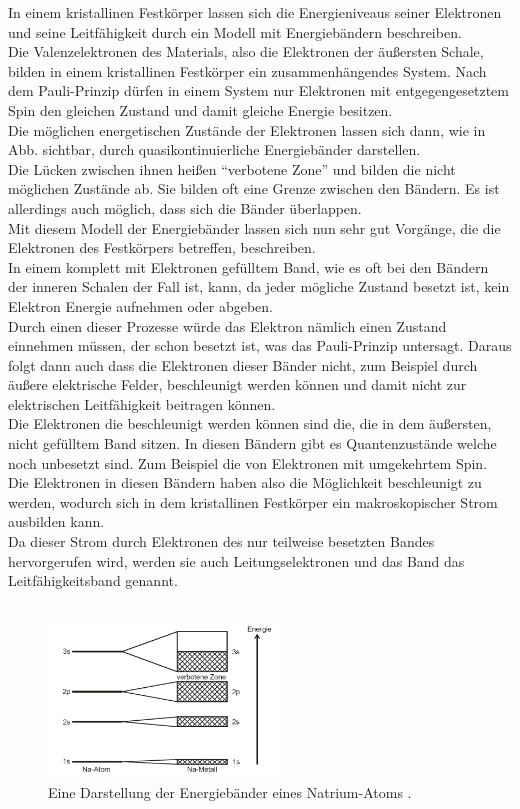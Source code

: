 In einem kristallinen Festkörper lassen sich die Energieniveaus seiner Elektronen und seine Leitfähigkeit durch
ein Modell mit Energiebändern beschreiben.\\
Die Valenzelektronen des Materials, also die Elektronen der äußersten Schale, 
bilden in einem kristallinen Festkörper ein zusammenhängendes System. Nach dem Pauli-Prinzip dürfen in einem System nur Elektronen mit entgegengesetztem Spin
den gleichen Zustand und damit gleiche Energie besitzen.\\
Die möglichen energetischen Zustände der Elektronen lassen sich dann, wie in Abb. sichtbar,
durch quasikontinuierliche Energiebänder darstellen.\\
Die Lücken zwischen ihnen heißen \enquote{verbotene Zone} und bilden die nicht möglichen Zustände ab. 
Sie bilden oft eine Grenze zwischen den Bändern.
Es ist allerdings auch möglich, dass sich die Bänder überlappen.\\
Mit diesem Modell der Energiebänder lassen sich nun sehr gut Vorgänge, die die Elektronen des Festkörpers betreffen, beschreiben.\\
In einem komplett mit Elektronen gefülltem Band, wie es oft bei den Bändern der inneren 
Schalen der Fall ist, kann, da jeder mögliche Zustand besetzt ist,
kein Elektron Energie aufnehmen oder abgeben. \\
Durch einen dieser Prozesse würde das Elektron nämlich einen Zustand einnehmen müssen, der schon besetzt ist, was das Pauli-Prinzip untersagt.
Daraus folgt dann auch dass die Elektronen dieser Bänder nicht, zum Beispiel durch äußere elektrische Felder, beschleunigt werden können 
und damit nicht zur elektrischen Leitfähigkeit beitragen können.\\
Die Elektronen die beschleunigt werden können sind die, die in dem äußersten, nicht gefülltem Band sitzen.
In diesen Bändern gibt es Quantenzustände welche noch unbesetzt sind. Zum Beispiel die von Elektronen mit umgekehrtem Spin.
Die Elektronen in diesen Bändern haben also die Möglichkeit beschleunigt zu werden, wodurch sich in dem kristallinen Festkörper
ein makroskopischer Strom ausbilden kann.\\
Da dieser Strom durch Elektronen des nur teilweise besetzten Bandes hervorgerufen wird, werden sie auch Leitungselektronen und das Band das Leitfähigkeitsband genannt.\\\\

\begin{figure}[H]
  \centering
  \includegraphics[width=0.55\textwidth]{images/energiebaender.PNG}
  \caption{Eine Darstellung der Energiebänder eines Natrium-Atoms \protect \cite{V311}.}
  \label{img:band}
\end{figure}

